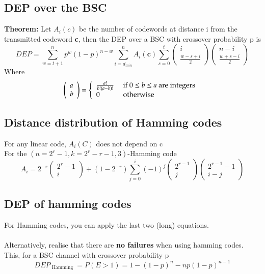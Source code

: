 \documentclass{article}[18pt]
\begin{document}
\subsection{DEP over the BSC}
\textbf{Theorem:} Let $A_i(c)$ be the number of codewords at distance i from the transmitted codeword \textbf{c}, then the DEP over a BSC with crossover probability p is
$$D E P = \sum _ { w = t + 1 } ^ { n } p ^ { w } ( 1 - p ) ^ { n - w } \sum _ { i = d _ { m i n } } ^ { n } A _ { i } ( \mathbf { c } ) \sum _ { s = 0 } ^ { t } \left( \begin{array} { c } { i } \\ { \frac { w - s + i } { 2 } } \end{array} \right) \left( \begin{array} { c } { n - i } \\ { \frac { w + s - i } { 2 } } \end{array} \right)$$
Where
$$\left( \begin{array} { l } { a } \\ { b } \end{array} \right) = \left\{ \begin{array} { l l } { \frac { a ! } { b ! ( a - b ) ! } } & { \text { if } 0 \leq b \leq a \text { are integers } } \\ { 0 } & { \text { otherwise } } \end{array} \right.$$
\subsection{Distance distribution of Hamming codes}
For any linear code, $A_i(C)$ does not depend on c\\
For the $\left( n = 2 ^ { r } - 1 , k = 2 ^ { r } - r - 1,3 \right)$-Hamming code
$$A _ { i } = 2 ^ { - r } \left( \begin{array} { c } { 2 ^ { r } - 1 } \\ { i } \end{array} \right) + \left( 1 - 2 ^ { - r } \right) \sum _ { j = 0 } ^ { i } ( - 1 ) ^ { j } \left( \begin{array} { c } { 2 ^ { r - 1 } } \\ { j } \end{array} \right) \left( \begin{array} { c } { 2 ^ { r - 1 } - 1 } \\ { i - j } \end{array} \right)$$
\subsection{DEP of hamming codes}
For Hamming codes, you can apply the last two (long) equations.\\
\\
Alternatively, realise that there are \textbf{no failures} when using hamming codes. This, for a BSC channel with crossover probability p
$$D E P _ { \text { Hamming } } = P ( E > 1 ) = 1 - ( 1 - p ) ^ { n } - n p ( 1 - p ) ^ { n - 1 }$$
\end{document}
